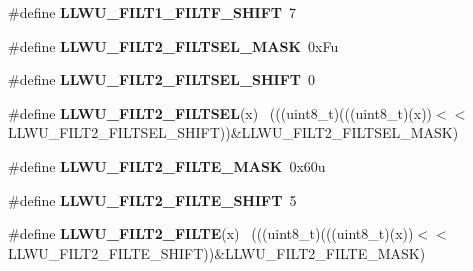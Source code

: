 \begin{DoxyCompactItemize}
\item 
\hypertarget{group___l_l_w_u___register___masks_ga359dd7a99c209dc7c2f26d79c061d11e}{}\#define {\bfseries L\+L\+W\+U\+\_\+\+F\+I\+L\+T1\+\_\+\+F\+I\+L\+T\+F\+\_\+\+S\+H\+I\+F\+T}~7\label{group___l_l_w_u___register___masks_ga359dd7a99c209dc7c2f26d79c061d11e}

\item 
\hypertarget{group___l_l_w_u___register___masks_gae610069172bf4a4b8f783d54faf97496}{}\#define {\bfseries L\+L\+W\+U\+\_\+\+F\+I\+L\+T2\+\_\+\+F\+I\+L\+T\+S\+E\+L\+\_\+\+M\+A\+S\+K}~0x\+Fu\label{group___l_l_w_u___register___masks_gae610069172bf4a4b8f783d54faf97496}

\item 
\hypertarget{group___l_l_w_u___register___masks_ga4589e4982f58847b133e9792fac931ac}{}\#define {\bfseries L\+L\+W\+U\+\_\+\+F\+I\+L\+T2\+\_\+\+F\+I\+L\+T\+S\+E\+L\+\_\+\+S\+H\+I\+F\+T}~0\label{group___l_l_w_u___register___masks_ga4589e4982f58847b133e9792fac931ac}

\item 
\hypertarget{group___l_l_w_u___register___masks_gad00e71efa7367646814288da10459226}{}\#define {\bfseries L\+L\+W\+U\+\_\+\+F\+I\+L\+T2\+\_\+\+F\+I\+L\+T\+S\+E\+L}(x)                                    ~(((uint8\+\_\+t)(((uint8\+\_\+t)(x))$<$$<$L\+L\+W\+U\+\_\+\+F\+I\+L\+T2\+\_\+\+F\+I\+L\+T\+S\+E\+L\+\_\+\+S\+H\+I\+F\+T))\&L\+L\+W\+U\+\_\+\+F\+I\+L\+T2\+\_\+\+F\+I\+L\+T\+S\+E\+L\+\_\+\+M\+A\+S\+K)\label{group___l_l_w_u___register___masks_gad00e71efa7367646814288da10459226}

\item 
\hypertarget{group___l_l_w_u___register___masks_ga6c6d4145e30bdb324bc6b137b2f7aada}{}\#define {\bfseries L\+L\+W\+U\+\_\+\+F\+I\+L\+T2\+\_\+\+F\+I\+L\+T\+E\+\_\+\+M\+A\+S\+K}~0x60u\label{group___l_l_w_u___register___masks_ga6c6d4145e30bdb324bc6b137b2f7aada}

\item 
\hypertarget{group___l_l_w_u___register___masks_gac309ec1ef795572d048b09ac35847bf1}{}\#define {\bfseries L\+L\+W\+U\+\_\+\+F\+I\+L\+T2\+\_\+\+F\+I\+L\+T\+E\+\_\+\+S\+H\+I\+F\+T}~5\label{group___l_l_w_u___register___masks_gac309ec1ef795572d048b09ac35847bf1}

\item 
\hypertarget{group___l_l_w_u___register___masks_ga990b42fa221f70b52fb360e95f86ccd4}{}\#define {\bfseries L\+L\+W\+U\+\_\+\+F\+I\+L\+T2\+\_\+\+F\+I\+L\+T\+E}(x)                                        ~(((uint8\+\_\+t)(((uint8\+\_\+t)(x))$<$$<$L\+L\+W\+U\+\_\+\+F\+I\+L\+T2\+\_\+\+F\+I\+L\+T\+E\+\_\+\+S\+H\+I\+F\+T))\&L\+L\+W\+U\+\_\+\+F\+I\+L\+T2\+\_\+\+F\+I\+L\+T\+E\+\_\+\+M\+A\+S\+K)\label{group___l_l_w_u___register___masks_ga990b42fa221f70b52fb360e95f86ccd4}


\end{DoxyCompactItemize}
